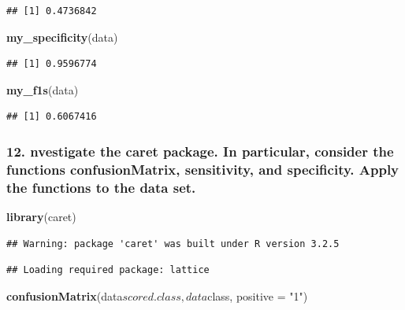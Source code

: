 \documentclass[]{article}
\newenvironment{Shaded}{\begin{snugshade}}{\end{snugshade}}
\newcommand{\KeywordTok}[1]{\textcolor[rgb]{0.13,0.29,0.53}{\textbf{{#1}}}}
\newcommand{\DataTypeTok}[1]{\textcolor[rgb]{0.13,0.29,0.53}{{#1}}}
\newcommand{\StringTok}[1]{\textcolor[rgb]{0.31,0.60,0.02}{{#1}}}
\newcommand{\NormalTok}[1]{{#1}}
\begin{document}
\begin{verbatim}
## [1] 0.4736842
\end{verbatim}

\begin{Shaded}
\begin{Highlighting}[]
\KeywordTok{my_specificity}\NormalTok{(data)}
\end{Highlighting}
\end{Shaded}

\begin{verbatim}
## [1] 0.9596774
\end{verbatim}

\begin{Shaded}
\begin{Highlighting}[]
\KeywordTok{my_f1s}\NormalTok{(data)}
\end{Highlighting}
\end{Shaded}

\begin{verbatim}
## [1] 0.6067416
\end{verbatim}

\subsubsection{12. nvestigate the caret package. In particular, consider
the functions confusionMatrix, sensitivity, and specificity. Apply the
functions to the data
set.}\label{nvestigate-the-caret-package.-in-particular-consider-the-functions-confusionmatrix-sensitivity-and-specificity.-apply-the-functions-to-the-data-set.}

\begin{Shaded}
\begin{Highlighting}[]
\KeywordTok{library}\NormalTok{(caret)}
\end{Highlighting}
\end{Shaded}

\begin{verbatim}
## Warning: package 'caret' was built under R version 3.2.5
\end{verbatim}

\begin{verbatim}
## Loading required package: lattice
\end{verbatim}

\begin{Shaded}
\begin{Highlighting}[]
\KeywordTok{confusionMatrix}\NormalTok{(data$scored.class, data$class, }\DataTypeTok{positive =} \StringTok{"1"}\NormalTok{)}
\end{Highlighting}
\end{Shaded}
\end{document}
